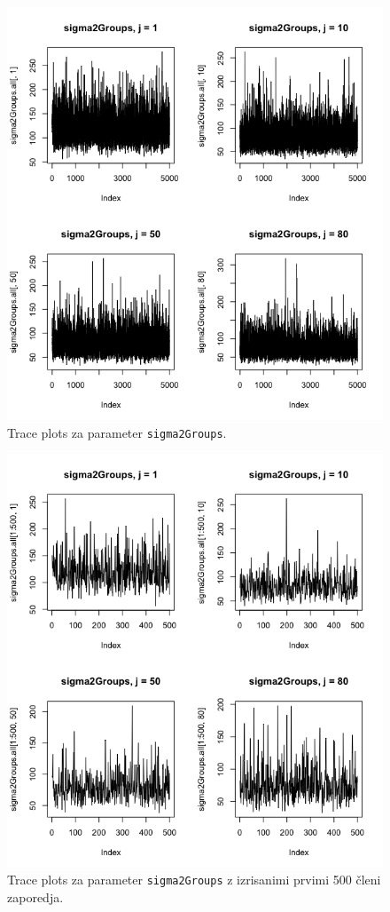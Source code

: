 \documentclass[a4paper,11pt]{article}
\begin{document}
\newpage
\begin{figure}[ht!]
    \centering
    \includegraphics[width = 150mm]{Slike/2_sigma2Groups.png}
    \caption{Trace plots za parameter \texttt{sigma2Groups}.}
\end{figure}
\newpage
\begin{figure}[ht!]
    \centering
    \includegraphics[width = 150mm]{Slike/2_sigma2Groups_500.png}
    \caption{Trace plots za parameter \texttt{sigma2Groups} z izrisanimi prvimi 500 členi zaporedja.}
\end{figure}
\end{document}
